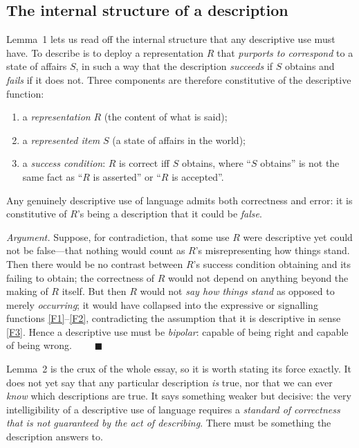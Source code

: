 \documentclass[12pt]{article}
\begin{document}
\subsection{The internal structure of a description}

Lemma~1 lets us read off the internal structure that any descriptive use
must have. To describe is to deploy a representation $R$ that
\emph{purports to correspond} to a state of affairs $S$, in such a way
that the description \emph{succeeds} if $S$ obtains and \emph{fails} if it
does not. Three components are therefore constitutive of the descriptive
function:

\begin{enumerate}[label=(\roman*),leftmargin=2.2em]
\item a \emph{representation} $R$ (the content of what is said);
\item a \emph{represented item} $S$ (a state of affairs in the world);
\item a \emph{success condition}: $R$ is correct iff $S$ obtains, where
``$S$ obtains'' is not the same fact as ``$R$ is asserted'' or ``$R$ is
accepted''.
\end{enumerate}

\begin{description}[leftmargin=1.6em,style=nextline]
\item[Lemma 2 (Bipolarity / the possibility of error).] Any genuinely
descriptive use of language admits both correctness and error: it is
constitutive of $R$'s being a description that it could be \emph{false}.
\end{description}

\noindent\emph{Argument.} Suppose, for contradiction, that some use $R$
were descriptive yet could not be false---that nothing would count as
$R$'s misrepresenting how things stand. Then there would be no contrast
between $R$'s success condition obtaining and its failing to obtain; the
correctness of $R$ would not depend on anything beyond the making of $R$
itself. But then $R$ would not \emph{say how things stand} as opposed to
merely \emph{occurring}; it would have collapsed into the expressive or
signalling functions \ref{F1}--\ref{F2}, contradicting the assumption
that it is descriptive in sense \ref{F3}. Hence a descriptive use must be
\emph{bipolar}: capable of being right and capable of being wrong.
$\qquad\blacksquare$

Lemma~2 is the crux of the whole essay, so it is worth stating its force
exactly. It does not yet say that any particular description \emph{is}
true, nor that we can ever \emph{know} which descriptions are true. It
says something weaker but decisive: the very intelligibility of a
descriptive use of language requires a \emph{standard of correctness that
is not guaranteed by the act of describing}. There must be something the
description answers to.
\end{document}
